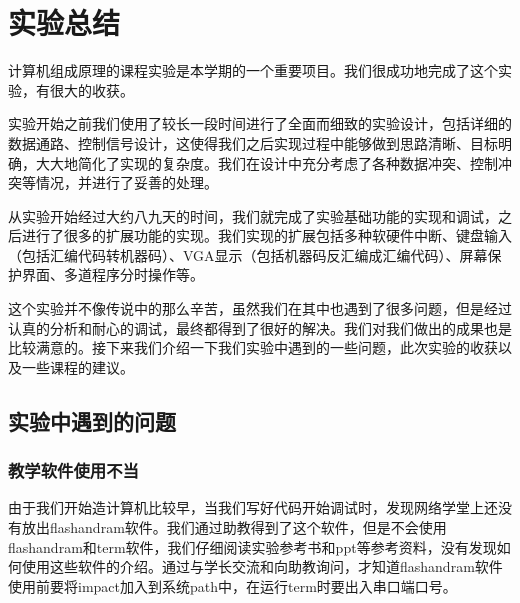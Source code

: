 
\chapter{实验总结} %

\label{Chapter6} %

计算机组成原理的课程实验是本学期的一个重要项目。我们很成功地完成了这个实验，有很大的收获。

实验开始之前我们使用了较长一段时间进行了全面而细致的实验设计，包括详细的数据通路、控制信号设计，这使得我们之后实现过程中能够做到思路清晰、目标明确，大大地简化了实现的复杂度。我们在设计中充分考虑了各种数据冲突、控制冲突等情况，并进行了妥善的处理。

从实验开始经过大约八九天的时间，我们就完成了实验基础功能的实现和调试，之后进行了很多的扩展功能的实现。我们实现的扩展包括多种软硬件中断、键盘输入（包括汇编代码转机器码）、VGA显示（包括机器码反汇编成汇编代码）、屏幕保护界面、多道程序分时操作等。

这个实验并不像传说中的那么辛苦，虽然我们在其中也遇到了很多问题，但是经过认真的分析和耐心的调试，最终都得到了很好的解决。我们对我们做出的成果也是比较满意的。接下来我们介绍一下我们实验中遇到的一些问题，此次实验的收获以及一些课程的建议。


\section{实验中遇到的问题}

\subsection{教学软件使用不当}

由于我们开始造计算机比较早，当我们写好代码开始调试时，发现网络学堂上还没有放出flashandram软件。我们通过助教得到了这个软件，但是不会使用flashandram和term软件，我们仔细阅读实验参考书和ppt等参考资料，没有发现如何使用这些软件的介绍。通过与学长交流和向助教询问，才知道flashandram软件使用前要将impact加入到系统path中，在运行term时要出入串口端口号。

